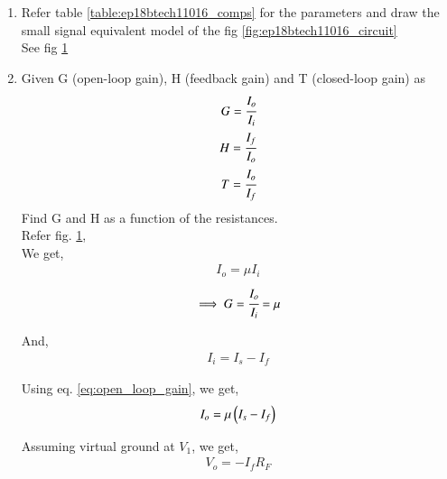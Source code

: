 \begin{enumerate}[label=\thesection.\arabic*.,ref=\thesection.\theenumi]
\item Refer table \ref{table:ep18btech11016_comps} for the parameters and draw the small signal equivalent model of the fig \ref{fig:ep18btech11016_circuit}
\\
\solution See fig \ref{fig:ep18btech11016_equi}
\\

\begin{table}[!ht]
    \centering
    
    \caption{}
    \label{table:ep18btech11016_comps}
\end{table}

\begin{figure}[!ht]
	\begin{center}
		\resizebox{\columnwidth}{!}{}
	\end{center}
\caption{}
\label{fig:ep18btech11016_equi}
\end{figure}


\item Given G (open-loop gain), H (feedback gain) and T (closed-loop gain) as
\begin{align}
    G = \cfrac{I_o}{I_i}\\
    H = \cfrac{I_f}{I_o}\\
    T = \cfrac{I_o}{I_f}
\end{align}
Find G and H as a function of the resistances.
\\
\solution Refer fig. \ref{fig:ep18btech11016_equi},\\
We get,
\begin{align}
    I_o = \mu I_i
\end{align}
\begin{align}
    \implies G = \cfrac{I_o}{I_i} = \mu
    \label{eq:open_loop_gain}
\end{align}

And,
\begin{align}
    I_i = I_s - I_f
\end{align}

Using eq. \ref{eq:open_loop_gain}, we get,
\begin{align}
    I_o = \mu \brak {I_s - I_f}
    \label{eq:out_cur}
\end{align}

Assuming virtual ground at $V_1$, we get,
\begin{align}
    V_o = - I_f R_F
\end{align}


\end{enumerate}
